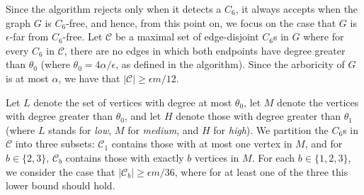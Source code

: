 \documentclass{article}
\newcommand{\eps}{\epsilon}
\newcommand{\calC}{{\mathcal{C}}}
\newcommand{\commentt}[1]{ {}}
\newcommand{\talya}[1]{{} }
\begin{document}
Since the algorithm rejects only when it detects a $C_6$, it always accepts when the graph $G$ is $C_6$-free, and hence, from this point on, we focus on the case that $G$ is $\eps$-far from $C_6$-free.
Let $\calC$ be a maximal set of edge-disjoint $C_6$s in $G$ where for every $C_6$ in $\calC$, there are no edges in which both endpoints have degree greater than $\theta_0$
(where $\theta_0 = 4\alpha/\eps$, as defined in the algorithm).
Since the arboricity of $G$ is at most $\alpha$, 
we have that $|\calC| \geq \eps m/12$. 

Let $L$ denote the set of vertices with degree at most $\theta_0$, let $M$ denote the vertices with degree greater than $\theta_0$, and let $H$ denote those with degree greater than $\theta_1$ (where $L$ stands for \emph{low}, $M$ for \emph{medium}, and $H$ for \emph{high}).
 We partition the $C_6$s in $\calC$ into three subsets:  $\calC_1$ contains those with at most one vertex in $M$,  and for $b\in \{2,3\}$, $\calC_b$ contains those with exactly $b$ vertices in $M$. For each $b\in \{1,2,3\} $, we consider the case that $|\calC_b| \geq \eps m/36$, where for at least one of the three this lower bound should hold. %
\end{document}
